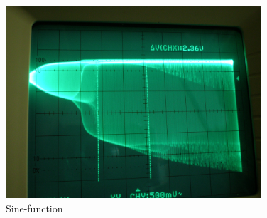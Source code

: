 \begin{figure}[H]
\centering \includegraphics[width= 0.85\textwidth]{Fotos2/19.JPG}
\caption{Sine-function}
\end{figure}

